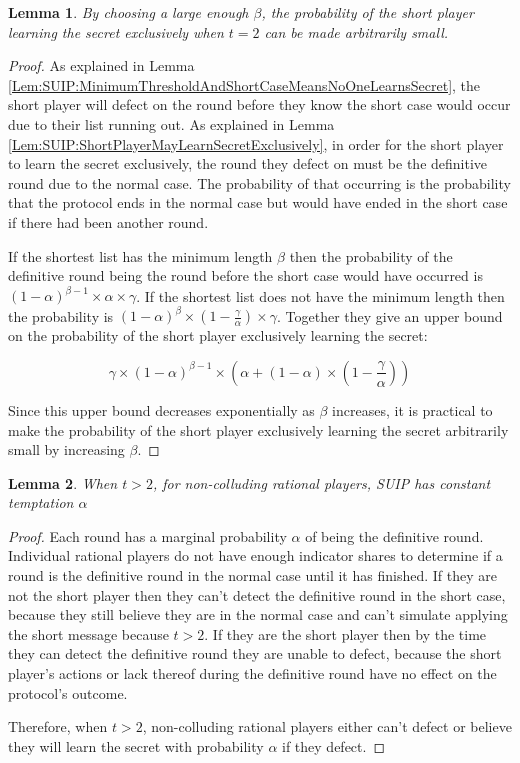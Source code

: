 \documentclass{dalcsthesis}
\newtheorem{lemma}{Lemma}
\begin{document}
\begin{lemma} By choosing a large enough $\beta$, the probability of the short player learning the secret exclusively when $t=2$ can be made arbitrarily small. \label{Lem:SUIP:ShortPlayerLearningSecretExclusivelyIsReducible} \end{lemma} 
\begin{proof}
As explained in Lemma \ref{Lem:SUIP:MinimumThresholdAndShortCaseMeansNoOneLearnsSecret}, the short player will defect on the round before they know the short case would occur due to their list running out. As explained in Lemma \ref{Lem:SUIP:ShortPlayerMayLearnSecretExclusively}, in order for the short player to learn the secret exclusively, the round they defect on must be the definitive round due to the normal case. The probability of that occurring is the probability that the protocol ends in the normal case but would have ended in the short case if there had been another round.

If the shortest list has the minimum length $\beta$ then the probability of the definitive round being the round before the short case would have occurred is $(1-\alpha)^{\beta-1} \times \alpha \times \gamma$. If the shortest list does not have the minimum length then the probability is $(1-\alpha)^\beta \times (1 - \frac{\gamma}{\alpha}) \times \gamma$. Together they give an upper bound on the probability of the short player exclusively learning the secret:

$$\gamma \times (1-\alpha)^{\beta-1} \times (\alpha + (1-\alpha) \times (1 - \frac{\gamma}{\alpha}))$$

Since this upper bound decreases exponentially as $\beta$ increases, it is practical to make the probability of the short player exclusively learning the secret arbitrarily small by increasing $\beta$.
\end{proof}

\begin{lemma} When $t > 2$, for non-colluding rational players, SUIP has constant temptation $\alpha$ \label{Lem:SUIP:NonColludersNotTemptedExceptT2} \end{lemma}
\begin{proof}
Each round has a marginal probability $\alpha$ of being the definitive round. Individual rational players do not have enough indicator shares to determine if a round is the definitive round in the normal case until it has finished. If they are not the short player then they can't detect the definitive round in the short case, because they still believe they are in the normal case and can't simulate applying the short message because $t > 2$. If they are the short player then by the time they can detect the definitive round they are unable to defect, because the short player's actions or lack thereof during the definitive round have no effect on the protocol's outcome.

Therefore, when $t > 2$, non-colluding rational players either can't defect or believe they will learn the secret with probability $\alpha$ if they defect.
\end{proof}
\end{document}
